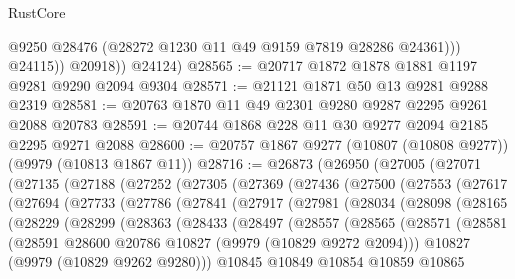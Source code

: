 \begin{lexlean}{RustCore}
\begin{coremodule}
                  @9250
                  @28476
                  (@28272 @1230 @11 @49 @9159 @7819 @28286 @24361)))
              @24115))
          @20918))
      @24124)
@28565 := @20717 @1872 @1878 @1881 @1197 @9281 @9290 @2094 @9304
@28571 := @21121 @1871 @50 @13 @9281 @9288 @2319
@28581 := @20763 @1870 @11 @49 @2301 @9280 @9287 @2295 @9261 @2088 @20783
@28591 := @20744 @1868 @228 @11 @30 @9277 @2094 @2185 @2295 @9271 @2088
@28600 := @20757 @1867 @9277 (@10807 (@10808 @9277)) (@9979 (@10813 @1867 @11))
@28716 := @26873
    (@26950
      (@27005
        (@27071
          (@27135
            (@27188
              (@27252
                (@27305
                  (@27369
                    (@27436
                      (@27500
                        (@27553
                          (@27617
                            (@27694
                              (@27733
                                (@27786
                                  (@27841
                                    (@27917
                                      (@27981
                                        (@28034
                                          (@28098
                                            (@28165
                                              (@28229
                                                (@28299
                                                  (@28363
                                                    (@28433
                                                      (@28497
                                                        (@28557
                                                          (@28565
                                                            (@28571
                                                              (@28581
                                                                (@28591
                                                                  @28600
                                                                  @20786
                                                                  @10827
                                                                  (@9979 (@10829 @9272 @2094)))
                                                                @10827
                                                                (@9979 (@10829 @9262 @9280)))
                                                              @10845
                                                              @10849
                                                              @10854
                                                              @10859
                                                              @10865

\end{coremodule}
\end{lexlean}
